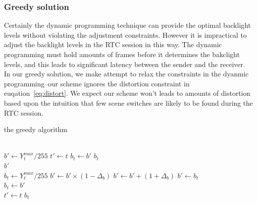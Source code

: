 
\subsubsection{Greedy solution}
\label{sec:greedy}
Certainly the dynamic programming technique can provide the optimal
backlight levels without violating the adjustment constraints. However
it is impractical to adjust the backlight levels in the RTC session in
this way. The dynamic programming must hold amounts of frames before
it determines the bakclight levels, and this leads to significant
latency between the sender and the receiver. In our greedy solution,
we make attempt to relax the constraints in the dyanmic
programming--our scheme ignores the distortion constraint in
euqation~\ref{eq:distort}. We expect our scheme won't leads to amounts
of distortion based upon the intuition that few scene switches are
likely to be found during the RTC session. 



\begin{algorithm}
  \caption{the greedy algorithm}
  \label{alg:greedy}
  \begin{algorithmic}[1]
    \\
      \State $b' \gets Y_{t}^{max} / 255$
      \State $t' \gets t$
      \State $b_t \gets b'$
      \Return $b_t$
    \EndIf
      \\
      \Return $b'$
    \EndIf
    \\

    \State $b_{t} \gets Y_{t}^{max} / 255$
      \State $b' \gets b' \times (1 - \Delta_{b})$
      \State $b' \gets b' + (1 + \Delta_{b})$
    \Else
      \State $b' \gets b_t$
    \EndIf
    \\
    \State $b_{t} \gets b'$\\
    \State $t' \gets t$
    \Return $b_{t}$
  \end{algorithmic}
  
\end{algorithm}


